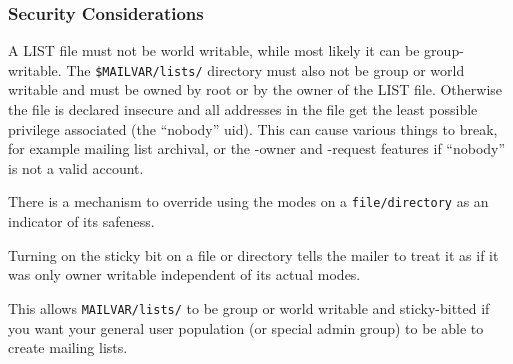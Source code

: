 \subsubsection{Security Considerations}



A LIST file must not be world writable, while most likely it can be
group-writable.
The {\tt \$MAILVAR/lists/} directory must also not be group or world
writable and must be owned by root or by the owner of the LIST file.
Otherwise the file is declared insecure and all addresses in the file
get the least possible privilege associated (the ``nobody'' uid).
This can cause various things to break, for example mailing list archival,
or the -owner and -request features if ``nobody'' is not a valid account.

There is a mechanism to override using the modes on a {\tt file/directory}
as an indicator of its safeness.

Turning on the sticky bit on a file or directory tells the mailer to treat
it as if it was only owner writable independent of its actual modes.

This allows {\tt MAILVAR/lists/} to be group or world writable and
sticky-bitted if you want your general user population (or special admin
group) to be able to create mailing lists.
